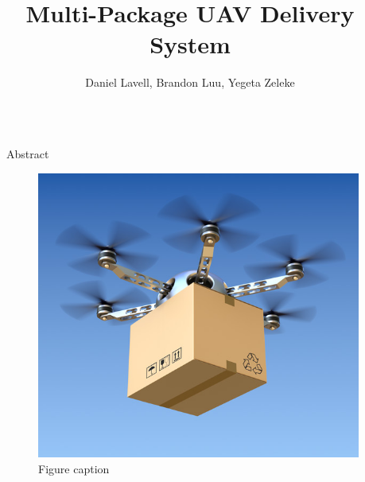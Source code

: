 \documentclass[final]{beamer}
\title{Multi-Package UAV Delivery System} %
\author{Daniel Lavell, Brandon Luu, Yegeta Zeleke} %
\institute{University of California, Santa Cruz} %
\newlength{\sepwid}
\newlength{\onecolwid}
\begin{document}

\setlength{\belowcaptionskip}{2ex} %
\setlength\belowdisplayshortskip{2ex} %

\begin{frame}[t] %

\begin{columns}[t] %

\begin{column}{\sepwid}\end{column} %

\begin{column}{\onecolwid} %


\begin{block}{Abstract}
{\small\par}

\end{block}



\begin{figure}
\includegraphics[width=0.8\linewidth]{images/delivery-drone.jpg}
\caption{Figure caption}
\end{figure}



\end{column}
\end{columns}
\end{frame}
\end{document}
